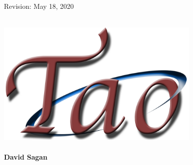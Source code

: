 \thispagestyle{empty}

\begin{flushright}
\large
Revision: May 18, 2020 \\
\end{flushright}

\vfill


{
\begin{center}
 \\
\vskip 0.2in
\includegraphics[width=10cm]{tao-logo.pdf} \\
\vskip 0.3in
 \\
\vskip 0.4in
{\huge \sf\bf David Sagan} \\
\end{center}
}

\vfill
\break
